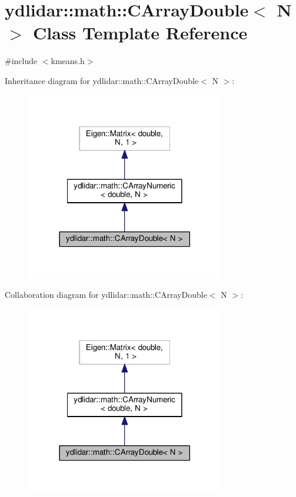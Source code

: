 \hypertarget{classydlidar_1_1math_1_1_c_array_double}{}\section{ydlidar\+:\+:math\+:\+:C\+Array\+Double$<$ N $>$ Class Template Reference}
\label{classydlidar_1_1math_1_1_c_array_double}


{\ttfamily \#include $<$kmeans.\+h$>$}



Inheritance diagram for ydlidar\+:\+:math\+:\+:C\+Array\+Double$<$ N $>$\+:\nopagebreak
\begin{figure}[H]
\begin{center}
\leavevmode
\includegraphics[width=246pt]{classydlidar_1_1math_1_1_c_array_double__inherit__graph}
\end{center}
\end{figure}


Collaboration diagram for ydlidar\+:\+:math\+:\+:C\+Array\+Double$<$ N $>$\+:\nopagebreak
\begin{figure}[H]
\begin{center}
\leavevmode
\includegraphics[width=246pt]{classydlidar_1_1math_1_1_c_array_double__coll__graph}
\end{center}
\end{figure}
